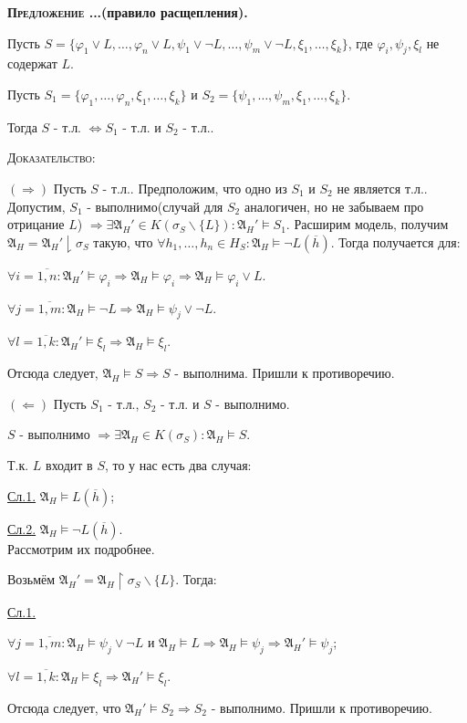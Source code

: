 \documentclass[18pt, a4paper]{extarticle}
\newcounter{par}
\newcounter{spar}
\newcounter{zap}
\newcommand{\predlT}[1]{\textbf{\textsc{Предложение \thepar.\if\thespar1\thespar.\fi\thezap.}(#1).}\stepcounter{zap}}
\newcommand{\mA}{\mathfrak{A}}
\newcommand{\dok}{\textsc{Доказательство:}}
\newcommand{\rightdok}{\boxed{(\Rightarrow)}}
\newcommand{\leftdok}{\boxed{(\Leftarrow)}}
\newcommand{\ovl}[1]{\overline{#1}}
\newcommand{\vp}{\varphi}
\newcommand{\vD}{\vDash}
\newcommand{\sg}{\sigma}
\newcommand{\lot}[3]{#1_#2,\dots,#1_#3}
\begin{document}
\predlT{правило расщепления}

Пусть $S=\{\vp_1\vee L,\dots,\vp_n\vee L,\psi_1\vee\lnot L,\dots,\psi_m\vee\lnot L,\lot \xi 1 k\}$, где $\vp_i,\psi_j,\xi_l$ не содержат $L$.

Пусть $S_1=\{\lot \vp 1 n,\lot \xi 1 k\}$ и $S_2=\{\lot \psi 1 m,\lot \xi 1 k\}$.

Тогда $S$ - т.л. $\Leftrightarrow S_1$ - т.л. и $S_2$ - т.л..

\dok

$\rightdok$ Пусть $S$ - т.л.. Предположим, что одно из $S_1$ и $S_2$ не является т.л..\\
Допустим, $S_1$ - выполнимо(случай для $S_2$ аналогичен, но не забываем про отрицание $L$) $\Rightarrow\exists\mA_H'\in K(\sg_S\backslash\{L\})\!:\mA_H'\vD S_1$. Расширим модель, получим \\
$\mA_H=\mA_H'\downharpoonright\sg_S$ такую, что $\forall\lot h 1 n\in H_S\!:\mA_H\vD\lnot L(\ovl h)$. Тогда получается для:

$\forall i=\ovl{1,n}\!:\mA_H'\vD\vp_i\Rightarrow\mA_H\vD\vp_i\Rightarrow\mA_H\vD\vp_i\vee L$.

$\forall j=\ovl{1,m}\!:\mA_H\vD\lnot L\Rightarrow\mA_H\vD\psi_j\vee\lnot L$.%

$\forall l=\ovl{1,k}\!:\mA_H'\vD\xi_l\Rightarrow\mA_H\vD\xi_l$.

Отсюда следует, $\mA_H\vD S\Rightarrow S$ - выполнима. Пришли к противоречию.

$\leftdok$ Пусть $S_1$ - т.л., $S_2$ - т.л. и $S$ - выполнимо.

$S$ - выполнимо $\Rightarrow\exists\mA_H\in K(\sg_S)\!:\mA_H\vD S$.

Т.к. $L$ входит в $S$, то у нас есть два случая:

\underline{Сл.1.} $\mA_H\vD L(\ovl h)$;

\underline{Сл.2.} $\mA_H\vD\lnot L(\ovl h)$.\\
Рассмотрим их подробнее.

Возьмём $\mA_H'=\mA_H\upharpoonright\sg_S\backslash\{L\}$. Тогда:

\underline{Сл.1.}

$\forall j=\ovl{1,m}\!:\mA_H\vD\psi_j\vee\lnot L$ и $\mA_H\vD L\Rightarrow\mA_H\vD\psi_j\Rightarrow\mA_H'\vD\psi_j$;

$\forall l=\ovl{1,k}\!:\mA_H\vD\xi_l\Rightarrow\mA_H'\vD\xi_l$.

Отсюда следует, что $\mA_H'\vD S_2\Rightarrow S_2$ - выполнимо. Пришли к противоречию.
\end{document}
